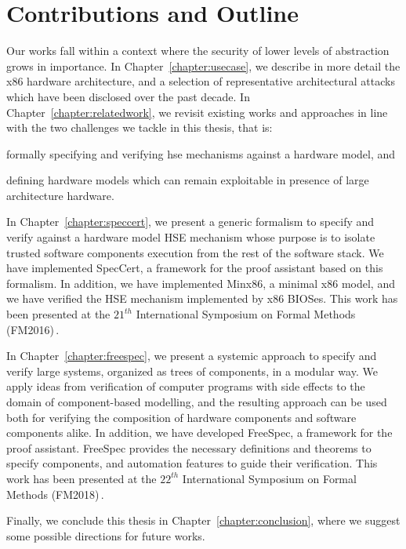 \section{Contributions and Outline}

Our works fall within a context where the security of lower levels of
abstraction grows in importance.
%
In Chapter~\ref{chapter:usecase}, we describe in more detail the x86 hardware
architecture, and a selection of representative architectural attacks which have
been disclosed over the past decade.
%
In Chapter~\ref{chapter:relatedwork}, we revisit existing works and approaches
in line with the two challenges we tackle in this thesis, that is:
%
\begin{inparaenum}[(1)]
\item formally specifying and verifying \ac{hse} mechanisms against a hardware
  model, and
%
\item defining hardware models which can remain exploitable in presence of large
  architecture hardware.
\end{inparaenum}

In Chapter~\ref{chapter:speccert}, we present a generic formalism to specify and
verify against a hardware model HSE mechanism whose purpose is to isolate
trusted software components execution from the rest of the software stack.
%
We have implemented SpecCert, a framework for the  proof assistant
based on this formalism. In addition, we have implemented {\sc Minx86}, a
minimal x86 model, and we have verified the HSE mechanism implemented by x86
BIOSes.
%
This work has been presented at the $21^{th}$ International Symposium on Formal
Methods (FM2016)\,\cite{letan2016speccert}.

In Chapter~\ref{chapter:freespec}, we present a systemic approach to specify and
verify large systems, organized as trees of components, in a modular way.
%
We apply ideas from verification of computer programs with side effects to the
domain of component-based modelling, and the resulting approach can be used both
for verifying the composition of hardware components and software components
alike.
%
In addition, we have developed FreeSpec, a framework for the  proof
assistant.
%
FreeSpec provides the necessary definitions and theorems to specify components,
and automation features to guide their verification.
%
This work has been presented at the $22^{th}$ International Symposium on Formal
Methods (FM2018)\,\cite{letan2018freespec}.

Finally, we conclude this thesis in Chapter~\ref{chapter:conclusion}, where we
suggest some possible directions for future works.
